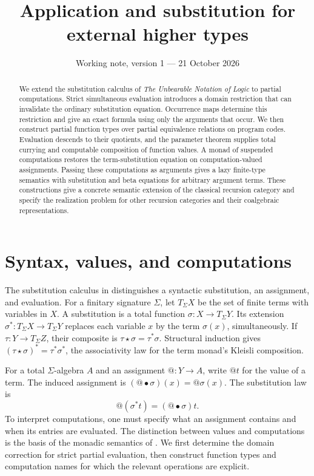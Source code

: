 \documentclass[11pt]{article}
\title{Application and substitution for external higher types}
\author{}
\date{Working note, version 1 --- 21 October 2026}
\makeatletter
\theoremstyle{definition}
\newcommand{\ats}{\mathord{@}}
\makeatother
\begin{document}
\maketitle
\begin{abstract}
We extend the substitution calculus of \emph{The Unbearable Notation of
Logic} to partial computations. Strict simultaneous evaluation introduces
a domain restriction that can invalidate the ordinary substitution equation.
Occurrence maps determine this restriction and give an exact formula using
only the arguments that occur. We then construct partial function types
over partial equivalence relations on program codes. Evaluation descends
to their quotients, and the parameter theorem supplies total currying and
computable composition of function values. A monad of suspended computations
restores the term-substitution equation on computation-valued assignments.
Passing these computations as arguments gives a lazy finite-type semantics
with substitution and beta equations for arbitrary argument terms.
These constructions give a concrete semantic extension of the classical
recursion category and specify the realization problem for other recursion
categories and their coalgebraic representations.
\end{abstract}

\section{Syntax, values, and computations}

The substitution calculus in \cite[Sections 3--6 and 8--9]{Notation}
distinguishes a syntactic substitution, an assignment, and evaluation.
For a finitary signature $\Sigma$, let $T_\Sigma X$ be the set of
finite terms with variables in $X$. A substitution is a total function
$\sigma:X\to T_\Sigma Y$. Its extension
$\sigma^*:T_\Sigma X\to T_\Sigma Y$ replaces each variable $x$
by the term $\sigma(x)$, simultaneously. If $\tau:Y\to T_\Sigma Z$,
their composite is $\tau\star\sigma=\tau^*\sigma$.
Structural induction gives
$(\tau\star\sigma)^*=\tau^*\sigma^*$, the associativity law
for the term monad's Kleisli composition.

For a total $\Sigma$-algebra $A$ and an assignment
$\ats:Y\to A$, write $\ats t$ for the value of a term.
The induced assignment is
$(\ats\bullet\sigma)(x)=\ats\sigma(x)$. The substitution law is
\begin{equation}\label{eq:at-law}
 \ats(\sigma^*t)=(\ats\bullet\sigma)t.
\end{equation}
To interpret computations, one must specify what an assignment contains
and when its entries are evaluated. The distinction between values and
computations is the basis of the monadic semantics of
\cite{Moggi,BFS}. We first determine the domain correction for strict
partial evaluation, then construct function types and computation names
for which the relevant operations are explicit.
\end{document}
